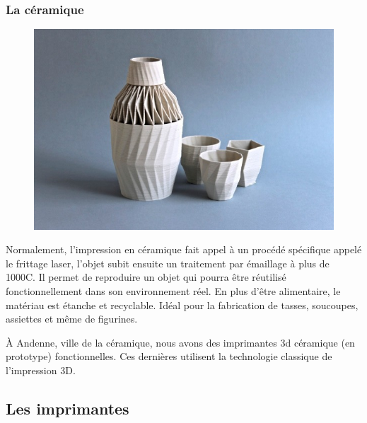 \documentclass{article}
\begin{document}
\subsubsection{La céramique}
\begin{figure}[h!]
\centering
\includegraphics[scale=0.3]{./images/ceramique.png}
\end{figure}\hfill
 \par\leavevmode\par
Normalement, l'impression en céramique fait appel à un procédé spécifique appelé le frittage laser, l'objet subit ensuite un traitement par émaillage à plus de 1000\degres C. Il permet de reproduire un objet qui pourra être réutilisé fonctionnellement dans son environnement réel. En plus d'être alimentaire, le matériau est étanche et recyclable. Idéal pour la fabrication de tasses, soucoupes, assiettes et même de figurines.\hfill
 \par\leavevmode\par
À Andenne, ville de la céramique, nous avons des imprimantes 3d céramique (en prototype) fonctionnelles. Ces dernières utilisent la technologie classique de l'impression 3D.
\newpage

\subsection{Les imprimantes}
\end{document}
